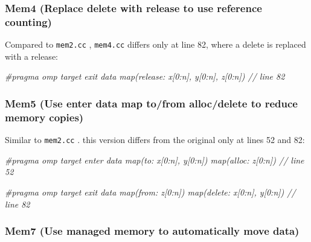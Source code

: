 \documentclass[
]{article}
\let\oldtexttt\texttt
\renewcommand{\texttt}[1]{
  \colorbox{Light}{\oldtexttt{#1}}
}
\newenvironment{Shaded}{}{}
\newcommand{\CommentTok}[1]{\textcolor[rgb]{0.38,0.63,0.69}{\textit{#1}}}
\begin{document}
\hypertarget{mem4-replace-delete-with-release-to-use-reference-counting}{%
\subsubsection{Mem4 (Replace delete with release to use reference
counting)}\label{mem4-replace-delete-with-release-to-use-reference-counting}}

Compared to \texttt{mem2.cc}, \texttt{mem4.cc} differs only at line 82,
where a delete is replaced with a release:

\begin{Shaded}
\begin{Highlighting}[]
\CommentTok{\#pragma omp target exit data map(release: x[0:n], y[0:n], z[0:n]) // line 82}
\end{Highlighting}
\end{Shaded}

\hypertarget{mem5-use-enter-data-map-tofrom-allocdelete-to-reduce-memory-copies}{%
\subsubsection{Mem5 (Use enter data map to/from alloc/delete to reduce
memory
copies)}\label{mem5-use-enter-data-map-tofrom-allocdelete-to-reduce-memory-copies}}

Similar to \texttt{mem2.cc}. this version differs from the original only
at lines 52 and 82:

\begin{Shaded}
\begin{Highlighting}[]
\CommentTok{\#pragma omp target enter data map(to: x[0:n], y[0:n]) map(alloc: z[0:n]) // line 52}
\end{Highlighting}
\end{Shaded}

\begin{Shaded}
\begin{Highlighting}[]
\CommentTok{\#pragma omp target exit data map(from: z[0:n]) map(delete: x[0:n], y[0:n]) // line 82}
\end{Highlighting}
\end{Shaded}

\hypertarget{mem7-use-managed-memory-to-automatically-move-data}{%
\subsubsection{Mem7 (Use managed memory to automatically move
data)}\label{mem7-use-managed-memory-to-automatically-move-data}}
\end{document}
